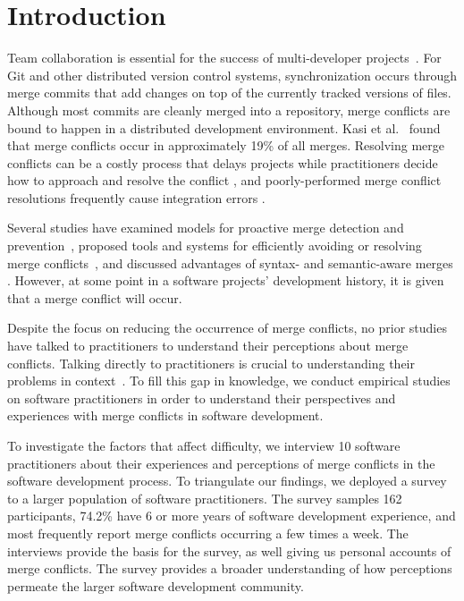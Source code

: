 
\section{Introduction}\label{introduction}


Team collaboration is essential for the success of multi-developer projects~\cite{hattori2010syde}.
For Git and other distributed version control systems, synchronization occurs through merge commits that add changes on top of the currently tracked versions of files.
Although most commits are cleanly merged into a repository, merge conflicts are bound to happen in a distributed development environment.
Kasi et al.~\cite{cassandra} found that merge conflicts occur in approximately 19\% of all merges.
Resolving merge conflicts can be a costly process that delays projects while practitioners decide how to approach and resolve the conflict \cite{cassandra}, and poorly-performed merge conflict resolutions frequently cause integration errors \cite{bird-branches-conflict}.

Several studies have examined models for proactive merge detection and prevention~\cite{Brun2011, palantir, Guimaraes}, proposed tools and systems for efficiently avoiding or resolving merge conflicts~\cite{nishimura}\cite{mens2002state}, and discussed advantages of syntax- and semantic-aware merges \cite{danny_refactorings}\cite{hunt2002extensible}. However, at some point in a software projects' development history, it is given that a merge conflict will occur. 

Despite the focus on reducing the occurrence of merge conflicts, no prior studies have talked to practitioners to understand their perceptions about merge conflicts.
Talking directly to practitioners is crucial to understanding their problems in context~\cite{fritz2010using, sillito2006questions, de2008answering, ko2007information}.
To fill this gap in knowledge, we conduct empirical studies on software practitioners in order to understand their perspectives and experiences with merge conflicts in software development.

To investigate the factors that affect difficulty, we interview 10 software practitioners about their experiences and perceptions of merge conflicts in the software development process.
To triangulate our findings, we deployed a survey to a larger population of software practitioners.
The survey samples 162 participants, 74.2\% have 6 or more years of software development experience, and most frequently report merge conflicts occurring a few times a week.
The interviews provide the basis for the survey, as well giving us personal accounts of merge conflicts.
The survey provides a broader understanding of how perceptions permeate the larger software development community.

